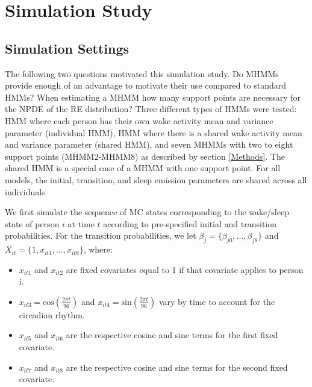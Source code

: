 \documentclass{article}
\begin{document}
\newpage

\section{Simulation Study}\label{SimStudy}

\subsection{Simulation Settings} \label{SimSettings}

The following two questions motivated this simulation study. Do MHMMs provide enough of an advantage to motivate their use compared to standard HMMs? When estimating a MHMM how many support points are necessary for the NPDE of the RE distribution? Three different types of HMMs were tested: HMM where each person has their own wake activity mean and variance parameter (individual HMM), HMM where there is a shared wake activity mean and variance parameter (shared HMM), and seven MHMMs with two to eight support points (MHMM2-MHMM8) as described by section \ref{Methods}. The shared HMM is a special case of a MHMM with one support point. For all models, the initial, transition, and sleep emission parameters are shared across all individuals.

We first simulate the sequence of MC states corresponding to the wake/sleep state of person $i$ at time $t$ according to pre-specified initial and transition probabilities. For the transition probabilities, we let $\beta_j = \{\beta_{j0}, ..., \beta_{j8}\}$ and $X_{it} = \{1, x_{it1}, ..., x_{it8}\}$, where:
\begin{itemize}
    \item $x_{it1}$ and $x_{it2}$ are fixed covariates equal to 1 if that covariate applies to person i.
    \item $x_{it3} = \text{cos}(\frac{2\pi t}{96})$ and $x_{it4} = \text{sin}(\frac{2\pi t}{96})$ vary by time to account for the circadian rhythm.
    \item $x_{it5}$ and $x_{it6}$ are the respective cosine and sine terms for the first fixed covariate.
    \item $x_{it7}$ and $x_{it8}$ are the respective cosine and sine terms for the second fixed covariate.
\end{itemize}
\end{document}

